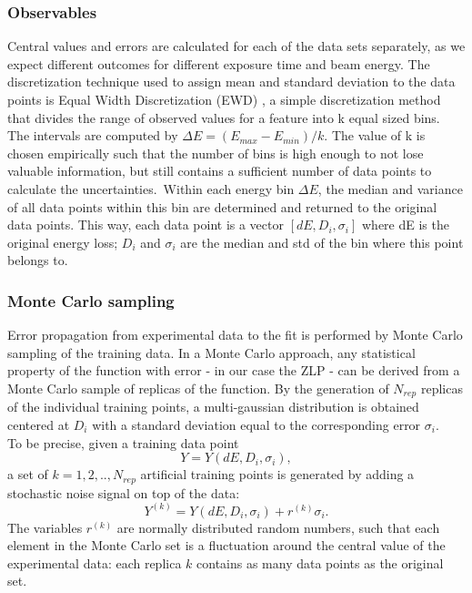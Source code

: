 \documentclass[11pt,a4paper]{article}
\numberwithin{equation}{section}
\numberwithin{figure}{section}
\numberwithin{table}{section}
\begin{document}
\subsubsection*{Observables}
Central values and errors are calculated for each of the data sets separately, as we expect different outcomes for different exposure time and beam energy. The discretization technique used to assign mean and standard deviation to the data points is Equal Width Discretization (EWD) \cite{ewd}, a simple discretization method that divides the range of observed values for a feature into k equal sized bins. The intervals are computed by 
$\Delta E = (E_{max} - E_{min}) / k$. The value of k is chosen empirically such that the number of bins is high enough to not lose valuable information, but still contains a sufficient number of data points to calculate the uncertainties.\
 Within each energy bin $\Delta E$, the median and variance of all data points within this bin are determined and returned to the original data points. This way, each data point is a vector $[dE, D_i, \sigma_i]$ where dE is the original energy loss; $D_i$ and $\sigma_i$ are the median and std of the bin where this point belongs to. 

\subsubsection*{Monte Carlo sampling}
Error propagation from experimental data to the fit is performed by Monte Carlo sampling of the training data. In a Monte Carlo approach, any statistical property of the function with error - in our case the ZLP - can be derived from a Monte Carlo sample of replicas of the function. By the generation of $N_{rep}$ replicas of the individual training points, a multi-gaussian distribution is obtained centered at $D_i$ with a standard deviation equal to the corresponding error $\sigma_i$. \\
To be precise, given a training data point
\begin{equation}
    Y = Y(dE, D_i,\sigma_i), 
\end{equation} a set of $k= 1,2,..,N_{rep}$ artificial training points is generated by adding a stochastic noise signal on top of the data: 
\begin{equation}
    Y^{(k)} = Y(dE, D_i,\sigma_i) + r^{(k)}\sigma_i.
\end{equation}
The variables $r^{(k)}$ are normally distributed random numbers, such that each element in the Monte Carlo set is a fluctuation around the central value of the experimental data: each replica $k$ contains as many data points as the original set. \\
\end{document}
